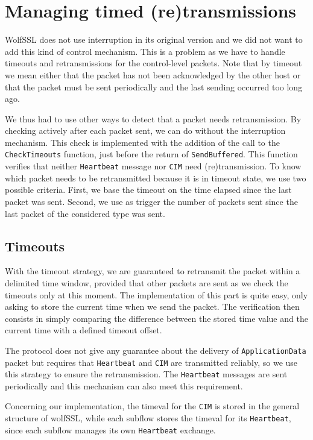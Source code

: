 \section{Managing timed (re)transmissions}

WolfSSL does not use interruption in its original version and we did not want to add this kind of control mechanism. This is a problem as we have to handle timeouts and retransmissions for the control-level packets. Note that by timeout we mean either that the packet has not been acknowledged by the other host or that the packet must be sent periodically and the last sending occurred too long ago.

We thus had to use other ways to detect that a packet needs retransmission. By checking actively after each packet sent, we can do without the interruption mechanism. This check is implemented with the addition of the call to the \texttt{CheckTimeouts} function, just before the return of \texttt{SendBuffered}. This function verifies that neither \texttt{Heartbeat} message nor \texttt{CIM} need (re)transmission. To know which packet needs to be retransmitted because it is in timeout state, we use two possible criteria. First, we base the timeout on the time elapsed since the last packet was sent. Second, we use as trigger the number of packets sent since the last packet of the considered type was sent.

\subsection{Timeouts}

With the timeout strategy, we are guaranteed to retransmit the packet within a delimited time window, provided that other packets are sent as we check the timeouts only at this moment. The implementation of this part is quite easy, only asking to store the current time when we send the packet. The verification then consists in simply comparing the difference between the stored time value and the current time with a defined timeout offset.

The protocol does not give any guarantee about the delivery of \texttt{ApplicationData} packet but requires that \texttt{Heartbeat} and \texttt{CIM} are transmitted reliably, so we use this strategy to ensure the retransmission. The \texttt{Heartbeat} messages are sent periodically and this mechanism can also meet this requirement.

Concerning our implementation, the timeval for the \texttt{CIM} is stored in the general structure of wolfSSL, while each subflow stores the timeval for its \texttt{Heartbeat}, since each subflow manages its own \texttt{Heartbeat} exchange.

